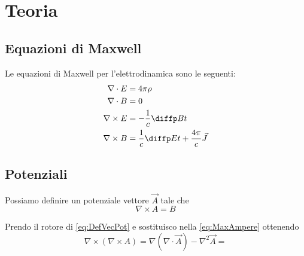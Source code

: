 \documentclass[a4paper,10pt,oneside]{math_article}
\newcommand{\rot}{\nabla \times}
\renewcommand{\div}{\nabla \cdot}
\newcommand{\grad}{\nabla}
\newcommand{\lapl}{\nabla^2}
\begin{document}
	\section{Teoria}
		\subsection{Equazioni di Maxwell}
			Le equazioni di Maxwell per l'elettrodinamica sono le seguenti:
			\begin{align}\displaystyle
				\div E &= 4\pi \rho \label{eq:MaxGauss}\\ 
				\div B &= 0 \label{eq:MaxMonopole} \\
				\rot E &= -\frac1c \diffp Bt \label{eq:MaxFaraday}\\
				\rot B &= \dfrac1c \diffp Et + \dfrac{4\pi}c \vec J \label{eq:MaxAmpere}
			\end{align}
			
		\subsection{Potenziali}
			Possiamo definire un potenziale vettore $\vec A$ tale che
			\begin{equation}\label{eq:DefVecPot}
			 \rot A = B
			\end{equation}

			Prendo il rotore di \ref{eq:DefVecPot} e sostituisco nella \ref{eq:MaxAmpere} ottenendo
			\begin{equation}
				\rot (\rot A) = \grad(\div \vec A) - \lapl \vec A = 
			\end{equation}
\end{document}
